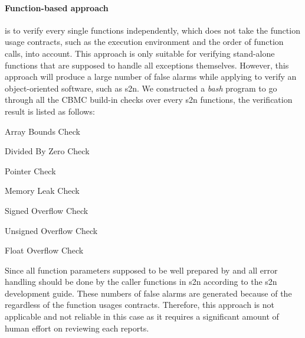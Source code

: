 \paragraph{Function-based approach} is to verify every single functions independently, which does not take the function usage contracts, such as the execution environment and the order of function calls, into account. This approach is only suitable for verifying stand-alone functions that are supposed to handle all exceptions themselves. However, this approach will produce a large number of false alarms while applying to verify an object-oriented software, such as s2n. We constructed a \textit{bash} program to go through all the CBMC build-in checks over every s2n functions, the verification result is listed as follows:

\begin{table}[H]
\centering
\begin{threeparttable}
     \renewcommand\TPTminimum{\linewidth}
    \begin{multicols}{3}
    \begin{tablenotes}\footnotesize
        \item[1] Array Bounds Check
        \item[2] Divided By Zero Check
        \item[3] Pointer Check
        \item[4] Memory Leak Check
        \item[5] Signed Overflow Check
        \item[6] Unsigned Overflow Check
        \item[7] Float Overflow Check
    \end{tablenotes}
    \end{multicols}
    \caption{Number of false alarms generated by using function-based approach}
    \label{tab:my_label}
\end{threeparttable}
\end{table}

Since all function parameters supposed to be well prepared by and all error handling should be done by the caller functions in s2n according to the s2n development guide. These numbers of false alarms are generated because of the regardless of the function usages contracts. Therefore, this approach is not applicable and not reliable in this case as it requires a significant amount of human effort on reviewing each reports. 

